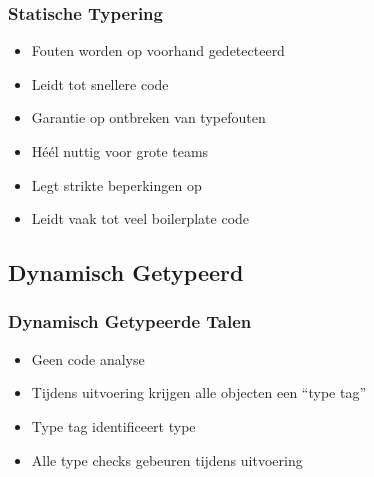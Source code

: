 \begin{frame}
  \frametitle{Statische Typering}
  \begin{itemize}
    \item Fouten worden op voorhand gedetecteerd
    \item Leidt tot snellere code
    \item Garantie op ontbreken van typefouten
    \item H\'e\'el nuttig voor grote teams
  \end{itemize}
  \vskip5mm
  \begin{itemize}
    \item Legt strikte beperkingen op
    \item Leidt vaak tot veel boilerplate code
  \end{itemize}
\end{frame}

\subsection{Dynamisch Getypeerd}

\frame{\tableofcontents[currentsubsection]}

\begin{frame}
  \frametitle{Dynamisch Getypeerde Talen}
  \begin{itemize}
    \item Geen code analyse
    \item Tijdens uitvoering krijgen alle objecten een ``type tag''
    \item Type tag identificeert type
    \item Alle type checks gebeuren tijdens uitvoering
  \end{itemize}
  \begin{center}
  \end{center}
\end{frame}

